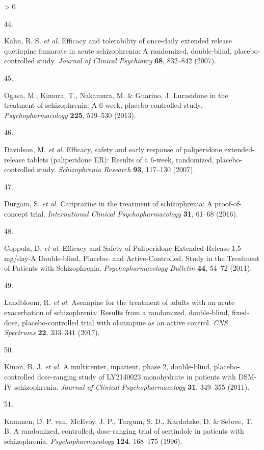 \documentclass[
  9pt,
  english,
  ,jou,floatsintext]{apa6}
\newlength{\cslhangindent}
\newlength{\csllabelwidth}
\newenvironment{CSLReferences}[2] %
 {%
  \setlength{\parindent}{0pt}
  \ifodd #1 \everypar{\setlength{\hangindent}{\cslhangindent}}\ignorespaces\fi
  \ifnum #2 > 0
  \setlength{\parskip}{#2\baselineskip}
  \fi
 }%
 {}
\newcommand{\CSLLeftMargin}[1]{\parbox[t]{\csllabelwidth}{#1}}
\newcommand{\CSLRightInline}[1]{\parbox[t]{\linewidth - \csllabelwidth}{#1}\break}
\begin{document}
\begin{CSLReferences}{0}{0}
\leavevmode\hypertarget{ref-Kahn2007}{}%
\CSLLeftMargin{44. }
\CSLRightInline{Kahn, R. S. \emph{et al.} Efficacy and tolerability of once-daily extended release quetiapine fumarate in acute schizophrenia: A randomized, double-blind, placebo-controlled study. \emph{Journal of Clinical Psychiatry} \textbf{68}, 832--842 (2007).}

\leavevmode\hypertarget{ref-Ogasa2013}{}%
\CSLLeftMargin{45. }
\CSLRightInline{Ogasa, M., Kimura, T., Nakamura, M. \& Guarino, J. Lurasidone in the treatment of schizophrenia: A 6-week, placebo-controlled study. \emph{Psychopharmacology} \textbf{225}, 519--530 (2013).}

\leavevmode\hypertarget{ref-Davidson2007}{}%
\CSLLeftMargin{46. }
\CSLRightInline{Davidson, M. \emph{et al.} Efficacy, safety and early response of paliperidone extended-release tablets (paliperidone {ER}): Results of a 6-week, randomized, placebo-controlled study. \emph{Schizophrenia Research} \textbf{93}, 117--130 (2007).}

\leavevmode\hypertarget{ref-Durgam2016}{}%
\CSLLeftMargin{47. }
\CSLRightInline{Durgam, S. \emph{et al.} Cariprazine in the treatment of schizophrenia: A proof-of-concept trial. \emph{International Clinical Psychopharmacology} \textbf{31}, 61--68 (2016).}

\leavevmode\hypertarget{ref-Coppola2011}{}%
\CSLLeftMargin{48. }
\CSLRightInline{Coppola, D. \emph{et al.} Efficacy and {Safety} of {Paliperidone} {Extended} {Release} 1.5 mg/day-{A} {Double}-blind, {Placebo}- and {Active}-{Controlled}, {Study} in the {Treatment} of {Patients} with {Schizophrenia}. \emph{Psychopharmacology Bulletin} \textbf{44}, 54--72 (2011).}

\leavevmode\hypertarget{ref-Landbloom2017}{}%
\CSLLeftMargin{49. }
\CSLRightInline{Landbloom, R. \emph{et al.} Asenapine for the treatment of adults with an acute exacerbation of schizophrenia: Results from a randomized, double-blind, fixed-dose, placebo-controlled trial with olanzapine as an active control. \emph{CNS Spectrums} \textbf{22}, 333--341 (2017).}

\leavevmode\hypertarget{ref-Kinon2011}{}%
\CSLLeftMargin{50. }
\CSLRightInline{Kinon, B. J. \emph{et al.} A multicenter, inpatient, phase 2, double-blind, placebo-controlled dose-ranging study of {LY2140023} monohydrate in patients with {DSM}-{IV} schizophrenia. \emph{Journal of Clinical Psychopharmacology} \textbf{31}, 349--355 (2011).}

\leavevmode\hypertarget{ref-VanKammen1996}{}%
\CSLLeftMargin{51. }
\CSLRightInline{Kammen, D. P. van, McEvoy, J. P., Targum, S. D., Kardatzke, D. \& Sebree, T. B. A randomized, controlled, dose-ranging trial of sertindole in patients with schizophrenia. \emph{Psychopharmacology} \textbf{124}, 168--175 (1996).}


\end{CSLReferences}
\end{document}
